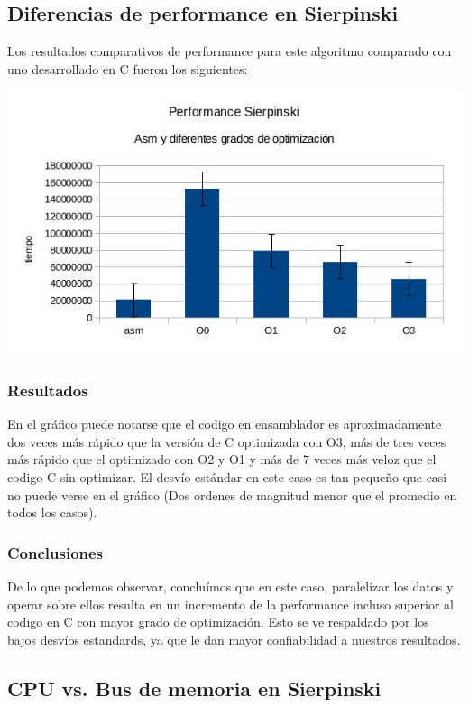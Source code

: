 \documentclass[a4paper]{article}
\begin{document}
\subsection{Diferencias de performance en Sierpinski}

Los resultados comparativos de performance para este algoritmo comparado con uno desarrollado en C fueron los siguientes:

  \begin{center}
  \includegraphics[scale=0.66]{Graficos1.4/sie/per.jpg}
  \end{center}

\subsubsection{Resultados}
En el gráfico puede notarse que el codigo en ensamblador es aproximadamente dos veces más rápido que la versión de C optimizada con O3, más de tres veces más rápido que el optimizado con O2 y O1 y más de 7 veces más veloz que el codigo C sin optimizar. El desvío estándar en este caso es tan pequeño que casi no puede verse en el gráfico (Dos ordenes de magnitud menor que el promedio en todos los casos).
\subsubsection{Conclusiones}

De lo que podemos observar, concluímos que en este caso, paralelizar los datos y operar sobre ellos resulta en un incremento de la performance incluso superior al codigo en C con mayor grado de optimización. Esto se ve respaldado por los bajos desvíos estandards, ya que le dan mayor confiabilidad a nuestros resultados.

\newpage
\subsection{CPU vs. Bus de memoria en Sierpinski}
\end{document}

